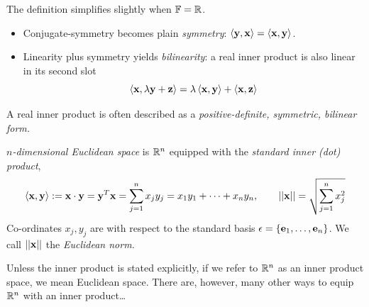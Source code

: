 


\label{sec:realbilinearity}

The definition simplifies slightly when $\mathbb{F}=\mathbb{R}$.
\begin{itemize}
  \item Conjugate-symmetry becomes plain \emph{symmetry}: $\left\langle {\mathbf{y}},{\mathbf{x}}\right\rangle=\left\langle {\mathbf{x}},{\mathbf{y}}\right\rangle$.
  \item Linearity plus symmetry yields \emph{bilinearity}: a real inner product is also linear in its second slot
  \[
  	\left\langle {\mathbf{x}},\lambda{\mathbf{y}}+{\mathbf{z}}\right\rangle=\lambda\left\langle {\mathbf{x}},{\mathbf{y}}\right\rangle+\left\langle {\mathbf{x}},{\mathbf{z}}\right\rangle
  \]
\end{itemize}
A real inner product is often described as a \emph{positive-definite, symmetric, bilinear form.}

\begin{defn}{}{}
	\emph{$n$-dimensional Euclidean space} is $\mathbb{R}^n$ equipped with the \emph{standard inner (dot) product},
	\[
		\left\langle {\mathbf{x}},{\mathbf{y}}\right\rangle :={\mathbf{x}}\cdot{\mathbf{y}} ={\mathbf{y}}^T{\mathbf{x}}
		=\sum_{j=1}^nx_jy_j
		=x_1y_1+\cdots+x_ny_n,\qquad 
		\left| \left| {\mathbf{x}}\right|\right|=\sqrt{\sum_{j=1}^nx_j^2}
	\]
	Co-ordinates $x_j,y_j$ are with respect to the standard basis $\epsilon=\{{\mathbf{e}}_1,\ldots,{\mathbf{e}}_{n}\}$. We call $\left| \left| {\mathbf{x}}\right|\right|$ the \emph{Euclidean norm.}
\end{defn}

Unless the inner product is stated explicitly, if we refer to $\mathbb{R}^n$ as an inner product space, we mean Euclidean space. There are, however, many other ways to equip $\mathbb{R}^n$ with an inner product\ldots


\pagebreak[3]


